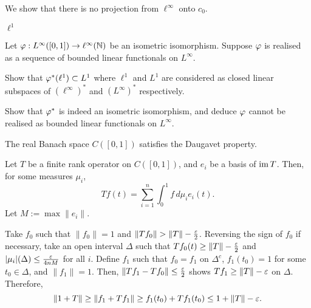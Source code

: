 \documentclass{../../large}
\begin{document}
\begin{prb}
We show that there is no projection from $\ell^\infty$ onto $c_0$.
\end{prb}

\begin{prb}
$\ell^1$
\end{prb}

\begin{prb}
Let $\varphi:L^\infty([0,1])\to\ell^\infty(\mathbb{N})$ be an isometric isomorphism.
Suppose $\varphi$ is realised as a sequence of bounded linear functionals on $L^\infty$.
\begin{parts}
\item
Show that $\varphi^*(\ell^1)\subset L^1$ where $\ell^1$ and $L^1$ are considered as closed linear subspaces of $(\ell^\infty)^*$ and $(L^\infty)^*$ respectively.
\item Show that $\varphi^*$ is indeed an isometric isomorphism, and deduce $\varphi$ cannot be realised as bounded linear functionals on $L^\infty$.
\end{parts}
\end{prb}


\begin{prb}
\begin{parts}
\item The real Banach space $C([0,1])$ satisfies the Daugavet property.
\end{parts}
\end{prb}
\begin{pf}
Let $T$ be a finite rank operator on $C([0,1])$, and $e_i$ be a basis of $\operatorname{im} T$.
Then, for some measures $\mu_i$,
\[Tf(t)=\sum_{i=1}^n\int_0^1f\,d\mu_ie_i(t).\]
Let $M:=\max\|e_i\|$.

Take $f_0$ such that $\|f_0\|=1$ and $\|Tf_0\|>\|T\|-\frac\e2$.
Reversing the sign of $f_0$ if necessary, take an open interval $\Delta$ such that $Tf_0(t)\ge\|T\|-\frac{\varepsilon}2$ and $|\mu_i|(\Delta)\le\frac{\varepsilon}{4nM}$ for all $i$.
Define $f_1$ such that $f_0=f_1$ on $\Delta^c$, $f_1(t_0)=1$ for some $t_0\in\Delta$, and $\|f_1\|=1$.
Then, $\|Tf_1-Tf_0\|\le\frac{\varepsilon}2$ shows $Tf_1\ge\|T\|-\varepsilon$ on $\Delta$.
Therefore,
\[\|1+T\|\ge\|f_1+Tf_1\|\ge f_1(t_0)+Tf_1(t_0)\le1+\|T\|-\varepsilon.\]
\end{pf}
\end{document}
